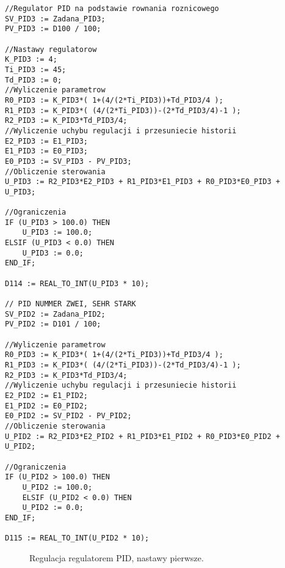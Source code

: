 \begin{lstlisting}[style=customlatex,frame=single, caption=Kod regulatora PID, label=lst:pid]
//Regulator PID na podstawie rownania roznicowego
SV_PID3 := Zadana_PID3;
PV_PID3 := D100 / 100;

//Nastawy regulatorow
K_PID3 := 4;
Ti_PID3 := 45;
Td_PID3 := 0;
//Wyliczenie parametrow
R0_PID3 := K_PID3*( 1+(4/(2*Ti_PID3))+Td_PID3/4 );
R1_PID3 := K_PID3*( (4/(2*Ti_PID3))-(2*Td_PID3/4)-1 );
R2_PID3 := K_PID3*Td_PID3/4;
//Wyliczenie uchybu regulacji i przesuniecie historii
E2_PID3 := E1_PID3;
E1_PID3 := E0_PID3;
E0_PID3 := SV_PID3 - PV_PID3;
//Obliczenie sterowania
U_PID3 := R2_PID3*E2_PID3 + R1_PID3*E1_PID3 + R0_PID3*E0_PID3 + U_PID3;

//Ograniczenia
IF (U_PID3 > 100.0) THEN
	U_PID3 := 100.0;
ELSIF (U_PID3 < 0.0) THEN
	U_PID3 := 0.0;
END_IF;

D114 := REAL_TO_INT(U_PID3 * 10);

// PID NUMMER ZWEI, SEHR STARK
SV_PID2 := Zadana_PID2;
PV_PID2 := D101 / 100;

//Wyliczenie parametrow
R0_PID3 := K_PID3*( 1+(4/(2*Ti_PID3))+Td_PID3/4 );
R1_PID3 := K_PID3*( (4/(2*Ti_PID3))-(2*Td_PID3/4)-1 );
R2_PID3 := K_PID3*Td_PID3/4;
//Wyliczenie uchybu regulacji i przesuniecie historii
E2_PID2 := E1_PID2;
E1_PID2 := E0_PID2;
E0_PID2 := SV_PID2 - PV_PID2;
//Obliczenie sterowania
U_PID2 := R2_PID3*E2_PID2 + R1_PID3*E1_PID2 + R0_PID3*E0_PID2 + U_PID2;

//Ograniczenia
IF (U_PID2 > 100.0) THEN
	U_PID2 := 100.0;
	ELSIF (U_PID2 < 0.0) THEN
	U_PID2 := 0.0;
END_IF;

D115 := REAL_TO_INT(U_PID2 * 10);
\end{lstlisting}

\begin{figure}[tb]
\centering
{}
\caption{Regulacja regulatorem PID, nastawy pierwsze.}
\label{fig:pid2_y}
\end{figure}

